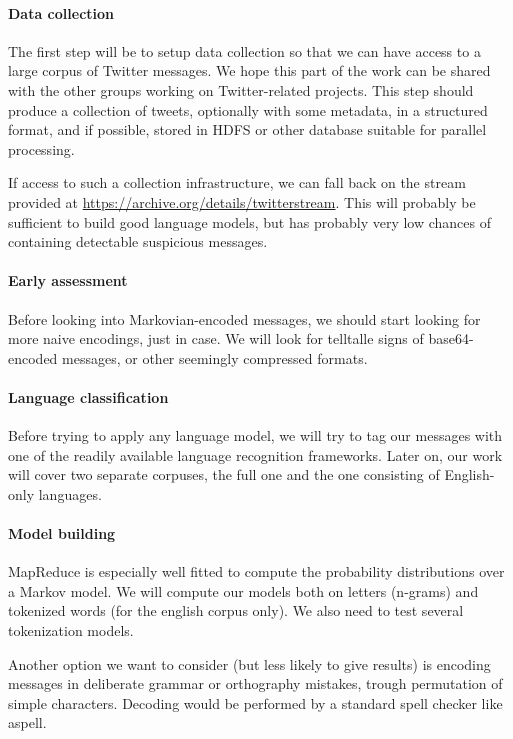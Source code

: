 \documentclass[a4paper,11pt]{article}
\begin{document}
\paragraph{Data collection}

The first step will be to setup data collection so that we can have access to a large corpus of Twitter messages. We hope this part of the work can be shared with the other groups working on Twitter-related projects. This step should produce a collection of tweets, optionally with some metadata, in a structured format, and if possible, stored in HDFS or other database suitable for parallel processing.

If access to such a collection infrastructure, we can fall back on the stream provided at \url{https://archive.org/details/twitterstream}. This will probably be sufficient to build good language models, but has probably very low chances of containing detectable suspicious messages.

\paragraph{Early assessment}

Before looking into Markovian-encoded messages, we should start looking for more naive encodings, just in case. We will look for telltalle signs of base64-encoded messages, or other seemingly compressed formats.

\paragraph{Language classification}

Before trying to apply any language model, we will try to tag our messages with one of the readily available language recognition frameworks. Later on, our work will cover two separate corpuses, the full one and the one consisting of English-only languages.

\paragraph{Model building}

MapReduce is especially well fitted to compute the probability distributions over a Markov model. We will compute our models both on letters (n-grams) and tokenized words (for the english corpus only). We also need to test several tokenization models.

Another option we want to consider (but less likely to give results) is encoding messages in deliberate grammar or orthography mistakes, trough permutation of simple characters. Decoding would be performed by a standard spell checker like aspell.
\end{document}
